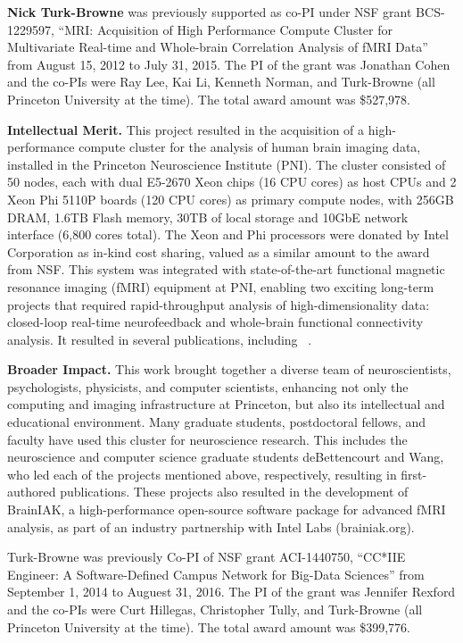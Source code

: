 

\textbf{Nick Turk-Browne} was previously supported as co-PI under NSF
grant BCS-1229597, ``MRI: Acquisition of High Performance Compute Cluster for Multivariate Real-time and Whole-brain Correlation Analysis of fMRI Data'' from August 15, 2012 to July 31, 2015. The PI of the grant was Jonathan Cohen and the co-PIs were Ray Lee, Kai Li, Kenneth Norman, and Turk-Browne (all Princeton University at the time). The total award amount was \$527,978.

{\bf Intellectual Merit.} This project resulted in the acquisition of a high-performance compute cluster for the analysis of human brain imaging data, installed in the Princeton Neuroscience Institute (PNI). The cluster consisted of 50 nodes, each with dual E5-2670 Xeon chips (16 CPU cores) as host CPUs and 2 Xeon Phi 5110P boards (120 CPU cores) as primary compute nodes, with 256GB DRAM, 1.6TB Flash memory, 30TB of local storage and 10GbE network interface (6,800 cores total). The Xeon and Phi processors were donated by Intel Corporation as in-kind cost sharing, valued as a similar amount to the award from NSF. This system was integrated with state-of-the-art functional magnetic resonance imaging (fMRI) equipment at PNI, enabling two exciting long-term projects that required rapid-throughput analysis of high-dimensionality data: closed-loop real-time neurofeedback and whole-brain functional connectivity analysis. It resulted in several publications, including ~\citep{Cohen:2017,deBettencourt:2015,Turk-Browne:2013,Wang:2015}.

{\bf Broader Impact.} This work brought together a diverse team of neuroscientists, psychologists, physicists, and computer scientists, enhancing not only the computing and imaging infrastructure at Princeton, but also its intellectual and educational environment. Many graduate students, postdoctoral fellows, and faculty have used this cluster for neuroscience research. This includes the neuroscience and computer science graduate students deBettencourt and Wang, who led each of the projects mentioned above, respectively, resulting in first-authored publications. These projects also resulted in the development of BrainIAK, a high-performance open-source software package for advanced fMRI analysis, as part of an industry partnership with Intel Labs (brainiak.org).

\vskip10pt \noindent Turk-Browne was previously Co-PI of NSF grant
ACI-1440750, ``CC*IIE Engineer: A Software-Defined Campus Network for Big-Data Sciences'' from September 1, 2014 to Auguest 31, 2016. The PI of the grant was Jennifer Rexford and the co-PIs were Curt Hillegas, Christopher Tully, and Turk-Browne (all Princeton University at the time). The total award amount was \$399,776.

